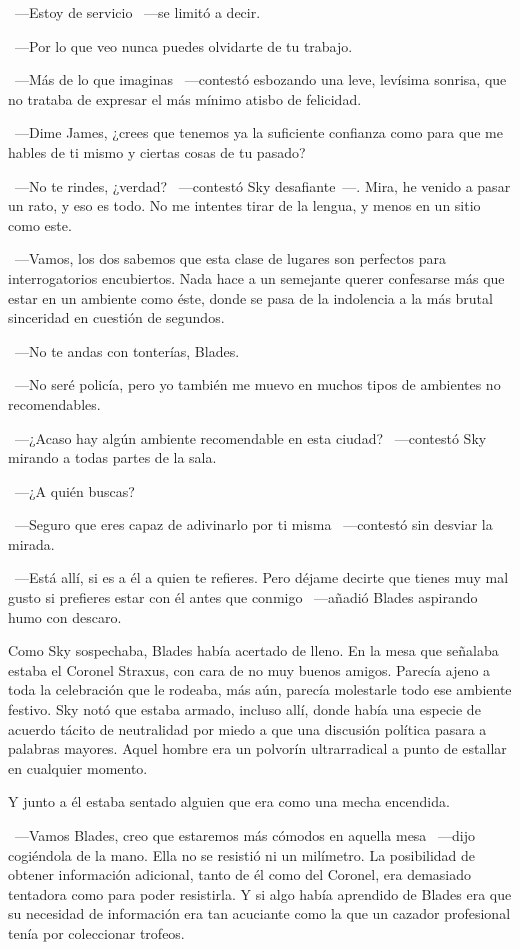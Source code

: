 ~---Estoy de servicio ~---se limitó a decir.

~---Por lo que veo nunca puedes olvidarte de tu trabajo.

~---Más de lo que imaginas ~---contestó esbozando una leve, levísima sonrisa, que no trataba de expresar el más mínimo atisbo de felicidad.

~---Dime James, ¿crees que tenemos ya la suficiente confianza como para que me hables de ti mismo y ciertas cosas de tu pasado?

~---No te rindes, ¿verdad? ~---contestó Sky desafiante~---. Mira, he venido a pasar un rato, y eso es todo. No me intentes tirar de la lengua, y menos en un sitio como este.

~---Vamos, los dos sabemos que esta clase de lugares son perfectos para interrogatorios encubiertos. Nada hace a un semejante querer confesarse más que estar en un ambiente como éste, donde se pasa de la indolencia a la más brutal sinceridad en cuestión de segundos.

~---No te andas con tonterías, Blades.

~---No seré policía, pero yo también me muevo en muchos tipos de ambientes no recomendables.

~---¿Acaso hay algún ambiente recomendable en esta ciudad? ~---contestó Sky mirando a todas partes de la sala.

~---¿A quién buscas?

~---Seguro que eres capaz de adivinarlo por ti misma ~---contestó sin desviar la mirada.

~---Está allí, si es a él a quien te refieres. Pero déjame decirte que tienes muy mal gusto si prefieres estar con él antes que conmigo ~---añadió Blades aspirando humo con descaro.

Como Sky sospechaba, Blades había acertado de lleno. En la mesa que señalaba estaba el Coronel Straxus, con cara de no muy buenos amigos. Parecía ajeno a toda la celebración que le rodeaba, más aún, parecía molestarle todo ese ambiente festivo. Sky notó que estaba armado, incluso allí, donde había una especie de acuerdo tácito de neutralidad por miedo a que una discusión política pasara a palabras mayores. Aquel hombre era un polvorín ultrarradical a punto de estallar en cualquier momento.

Y junto a él estaba sentado alguien que era como una mecha encendida.

~---Vamos Blades, creo que estaremos más cómodos en aquella mesa ~---dijo cogiéndola de la mano. Ella no se resistió ni un milímetro. La posibilidad de obtener información adicional, tanto de él como del Coronel, era demasiado tentadora como para poder resistirla. Y si algo había aprendido de Blades era que su necesidad de información era tan acuciante como la que un cazador profesional tenía por coleccionar trofeos.

